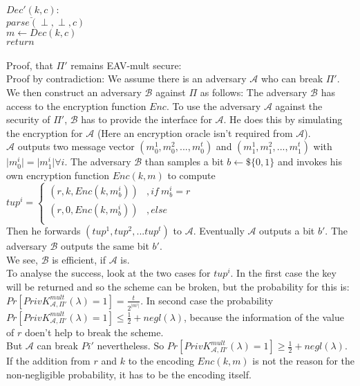 \noindent \(\underline{Dec'(k, c)}:\)\\
\(parse(\perp, \perp, c)\)\\
\(m \leftarrow  Dec(k,c)\)\\
\(return\)\\
\\
Proof, that \(\Pi'\) remains EAV-mult secure:\\
Proof by contradiction: We assume there is an adversary \(\mathcal{A}\) who can break \(\Pi'\). We then construct an adversary \(\mathcal{B}\) against \(\Pi\) as follows: The adversary \(\mathcal{B}\) has access to the encryption function \(Enc\). To use the adversary \(\mathcal{A}\) against the security of \(\Pi'\), \(\mathcal{B}\) has to provide the interface for \(\mathcal{A}\). He does this by simulating the encryption for \(\mathcal{A}\) (Here an encryption oracle isn't required from \(\mathcal{A}\)).\\
\(\mathcal{A}\) outputs two message vector  \((m_0^1, m_0^2,..., m_0^t)\) and \((m_1^1, m_1^2,..., m_1^t)\) with \(\vert m_0^i \vert = \vert m_1^i \vert \forall i\). The adversary \(\mathcal{B}\) than samples a bit \(b \leftarrow\$ \{0,1\}\) and invokes his own encryption function \(Enc(k,m)\) to compute \(tup^i = \left\{
\begin{array}{ll}
	(r,k, Enc(k,m_b^i)) & ,if\ m_b^i = r\\
	(r, 0, Enc(k,m_b^i)) & ,else\\
\end{array}
\right.	\)\\
Then he forwards \(\left(tup^1, tup^2, ... tup^t\right)\) to \(\mathcal{A}\). Eventually \(\mathcal{A}\) outputs a bit \(b'\). The adversary \(\mathcal{B}\) outputs the same bit \(b'\).\\
We see, \(\mathcal{B}\) is efficient, if \(\mathcal{A}\) is. \\
To analyse the success, look at the two cases for \(tup^i\). In the first case the key will be returned and so the scheme can be broken, but the probability for this is: \(Pr[PrivK^{mult}_{\mathcal{A}, \Pi'}(\lambda) = 1] = \frac{t}{2^{\vert m^i \vert}}  \). In second case the probability \(Pr[PrivK^{mult}_{\mathcal{A}, \Pi'}(\lambda) = 1] \le \frac{1}{2} + negl(\lambda)\), because the information of the value of \(r\) doen't help to break the scheme.\\
But \(\mathcal{A}\) can break \(Pi'\) nevertheless. So \(Pr[PrivK^{mult}_{\mathcal{A}, \Pi'} (\lambda) = 1] \ge \frac{1}{2} + negl(\lambda) \). If the addition from \(r\) and \(k\) to the encoding \(Enc(k,m)\) is not the reason for the non-negligible probability, it has to be the encoding itself.\\ 
